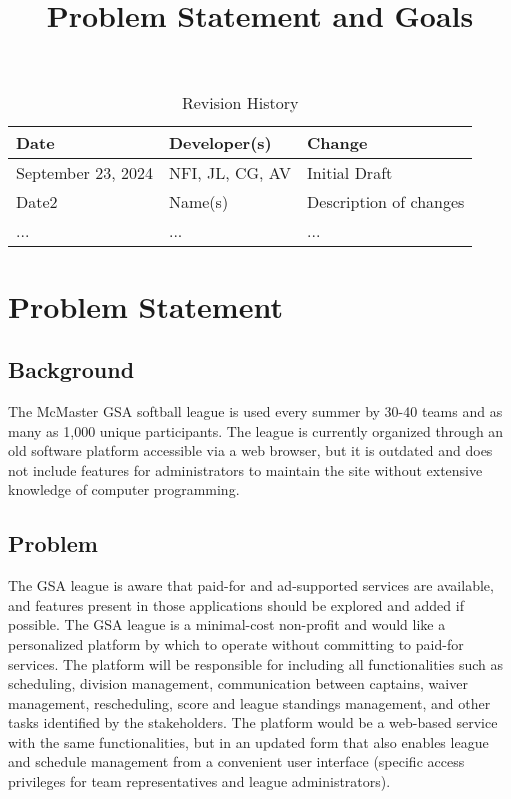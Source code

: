 \documentclass{article}
\title{Problem Statement and Goals\\\progname}
\author{\authname}
\date{}
\begin{document}
\maketitle

\begin{table}[hp]
\caption{Revision History} \label{TblRevisionHistory}
\begin{tabularx}{\textwidth}{llX}
\toprule
\textbf{Date} & \textbf{Developer(s)} & \textbf{Change}\\
\midrule
September 23, 2024 & NFI, JL, CG, AV & Initial Draft\\
Date2 & Name(s) & Description of changes\\
... & ... & ...\\
\bottomrule
\end{tabularx}
\end{table}

\section{Problem Statement}

\subsection{Background}



The McMaster GSA softball league is used every summer by 30-40 teams and
as many as 1,000 unique participants. The league is currently organized through
an old software platform accessible via a web browser, but it is outdated and
does not include features for administrators to maintain the site without
extensive knowledge of computer programming.

\subsection{Problem}

\indent \indent The GSA league is aware that paid-for and ad-supported services are available,
and features present in those applications should be explored and added if
possible. The GSA league is a minimal-cost non-profit and would like a
personalized platform by which to operate without committing to paid-for
services. The platform will be responsible for including all functionalities
such as scheduling, division management, communication between captains, waiver
management, rescheduling, score and league standings management, and other
tasks identified by the stakeholders. The platform would be a web-based service
with the same functionalities, but in an updated form that also enables league
and schedule management from a convenient user interface
(specific access privileges for team representatives and league administrators).
\end{document}
